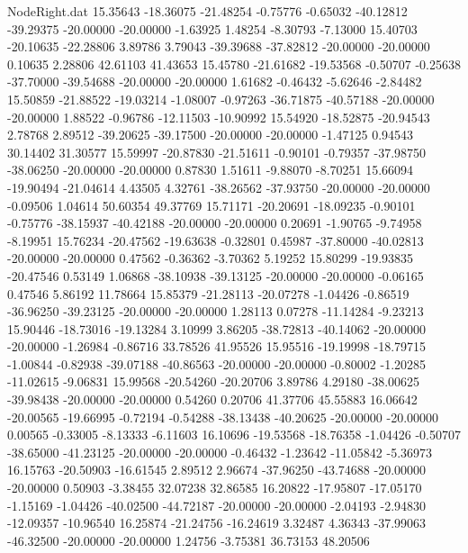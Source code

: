 \begin{filecontents}{NodeRight.dat}
  15.35643  -18.36075  -21.48254    -0.75776   -0.65032  -40.12812  -39.29375  -20.00000  -20.00000   -1.63925    1.48254   -8.30793   -7.13000
  15.40703  -20.10635  -22.28806     3.89786    3.79043  -39.39688  -37.82812  -20.00000  -20.00000    0.10635    2.28806   42.61103   41.43653
  15.45780  -21.61682  -19.53568    -0.50707   -0.25638  -37.70000  -39.54688  -20.00000  -20.00000    1.61682   -0.46432   -5.62646   -2.84482
  15.50859  -21.88522  -19.03214    -1.08007   -0.97263  -36.71875  -40.57188  -20.00000  -20.00000    1.88522   -0.96786  -12.11503  -10.90992
  15.54920  -18.52875  -20.94543     2.78768    2.89512  -39.20625  -39.17500  -20.00000  -20.00000   -1.47125    0.94543   30.14402   31.30577
  15.59997  -20.87830  -21.51611    -0.90101   -0.79357  -37.98750  -38.06250  -20.00000  -20.00000    0.87830    1.51611   -9.88070   -8.70251
  15.66094  -19.90494  -21.04614     4.43505    4.32761  -38.26562  -37.93750  -20.00000  -20.00000   -0.09506    1.04614   50.60354   49.37769
  15.71171  -20.20691  -18.09235    -0.90101   -0.75776  -38.15937  -40.42188  -20.00000  -20.00000    0.20691   -1.90765   -9.74958   -8.19951
  15.76234  -20.47562  -19.63638    -0.32801    0.45987  -37.80000  -40.02813  -20.00000  -20.00000    0.47562   -0.36362   -3.70362    5.19252
  15.80299  -19.93835  -20.47546     0.53149    1.06868  -38.10938  -39.13125  -20.00000  -20.00000   -0.06165    0.47546    5.86192   11.78664
  15.85379  -21.28113  -20.07278    -1.04426   -0.86519  -36.96250  -39.23125  -20.00000  -20.00000    1.28113    0.07278  -11.14284   -9.23213
  15.90446  -18.73016  -19.13284     3.10999    3.86205  -38.72813  -40.14062  -20.00000  -20.00000   -1.26984   -0.86716   33.78526   41.95526
  15.95516  -19.19998  -18.79715    -1.00844   -0.82938  -39.07188  -40.86563  -20.00000  -20.00000   -0.80002   -1.20285  -11.02615   -9.06831
  15.99568  -20.54260  -20.20706     3.89786    4.29180  -38.00625  -39.98438  -20.00000  -20.00000    0.54260    0.20706   41.37706   45.55883
  16.06642  -20.00565  -19.66995    -0.72194   -0.54288  -38.13438  -40.20625  -20.00000  -20.00000    0.00565   -0.33005   -8.13333   -6.11603
  16.10696  -19.53568  -18.76358    -1.04426   -0.50707  -38.65000  -41.23125  -20.00000  -20.00000   -0.46432   -1.23642  -11.05842   -5.36973
  16.15763  -20.50903  -16.61545     2.89512    2.96674  -37.96250  -43.74688  -20.00000  -20.00000    0.50903   -3.38455   32.07238   32.86585
  16.20822  -17.95807  -17.05170    -1.15169   -1.04426  -40.02500  -44.72187  -20.00000  -20.00000   -2.04193   -2.94830  -12.09357  -10.96540
  16.25874  -21.24756  -16.24619     3.32487    4.36343  -37.99063  -46.32500  -20.00000  -20.00000    1.24756   -3.75381   36.73153   48.20506

\end{filecontents}
